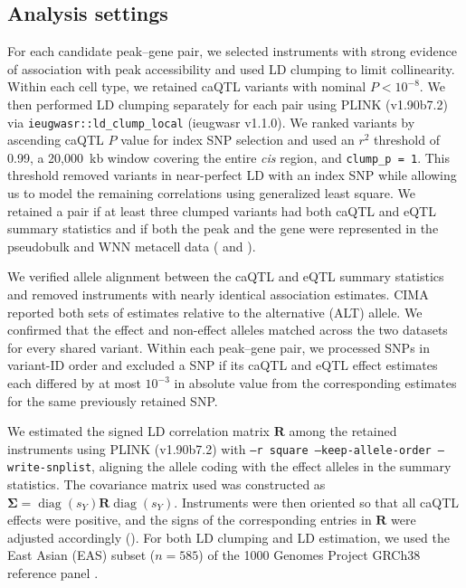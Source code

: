 \subsection{Analysis settings}
\label{sec:data-preprocessing}

\noindent For each candidate peak--gene pair, we selected instruments with strong evidence of association with peak accessibility and used LD clumping to limit collinearity. Within each cell type, we retained caQTL variants with nominal $P<10^{-8}$. We then performed LD clumping separately for each pair using PLINK (v1.90b7.2) \cite{chang2015plink} via \texttt{ieugwasr::ld\_clump\_local} (ieugwasr v1.1.0). We ranked variants by ascending caQTL $P$ value for index SNP selection and used an $r^2$ threshold of 0.99, a 20,000~kb window covering the entire \textit{cis} region, and \texttt{clump\_p = 1}. This threshold removed variants in near-perfect LD with an index SNP while allowing us to model the remaining correlations using generalized least square. We retained a pair if at least three clumped variants had both caQTL and eQTL summary statistics and if both the peak and the gene were represented in the pseudobulk and WNN metacell data ( and ).

\noindent We verified allele alignment between the caQTL and eQTL summary statistics and removed instruments with nearly identical association estimates. CIMA reported both sets of estimates relative to the alternative (ALT) allele. We confirmed that the effect and non-effect alleles matched across the two datasets for every shared variant. Within each peak--gene pair, we processed SNPs in variant-ID order and excluded a SNP if its caQTL and eQTL effect estimates each differed by at most $10^{-3}$ in absolute value from the corresponding estimates for the same previously retained SNP.

\noindent We estimated the signed LD correlation matrix $\boldsymbol{R}$ among the retained instruments using PLINK (v1.90b7.2) with \texttt{--r square --keep-allele-order --write-snplist}, aligning the allele coding with the effect alleles in the summary statistics. The covariance matrix used  was constructed as $\boldsymbol{\Sigma}=\operatorname{diag}(s_Y)\boldsymbol{R}\operatorname{diag}(s_Y)$. Instruments were then oriented so that all caQTL effects were positive, and the signs of the corresponding entries in $\boldsymbol{R}$ were adjusted accordingly (). For both LD clumping and LD estimation, we used the East Asian (EAS) subset ($n=585$) of the 1000 Genomes Project GRCh38 reference panel \cite{byrskabishop2022onekg}.

